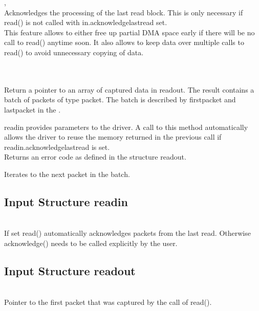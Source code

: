 	\device, \\
	Acknowledges the processing of the last read block. This is only necessary if \textsf{\prefix read()} is not called with 
	\textsf{in.acknowledge\tu last\tu read} set.\\
	This feature allows to either free up partial DMA space early if there will be no call to \textsf{\prefix read()} anytime soon. 
	It also allows to keep data over multiple calls to \textsf{\prefix read()} to avoid unnecessary copying of data. \par

	\device {} \\ \\
	Return a pointer to an array of captured data in \textsf{read\tu out}.
	The result contains a batch of packets of type \textsf{\prefix packet}. The batch
    is described by first\tu packet and last\tu packet in the .
    
	\textsf{read\tu in} provides parameters to the driver. 
	A call to this method automatically allows the driver to reuse the memory returned in the previous call if \textsf{read\tu in.acknowledge\tu last\tu read} is set.\\
	Returns an error code as defined in the structure \textsf{\prefix read\tu out}.

    	
    Iterates to the next packet in the batch. 

	\subsection{Input Structure \prefix read\tu in}

		\\
		If set \textsf{\prefix read()} automatically acknowledges packets from the last read. 
		Otherwise \textsf{\prefix acknowledge()} needs to be called explicitly by the user. 

	\subsection{Input Structure \prefix read\tu out}
		\\
		Pointer to the first packet that was captured by the call of \textsf{\prefix read()}.\par

